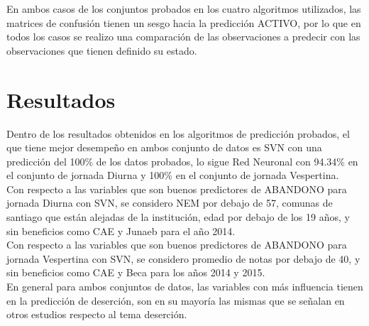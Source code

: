En ambos casos de los conjuntos probados en los cuatro algoritmos utilizados, las matrices de confusión tienen un sesgo hacia la predicción ACTIVO, por lo que en todos los casos se realizo una comparación de las observaciones a predecir con las observaciones que tienen definido su estado.\\

\section{Resultados}

Dentro de los resultados obtenidos en los algoritmos de predicción probados, el que tiene mejor desempeño en ambos conjunto de datos es SVN con una predicción del 100\% de los datos probados, lo sigue Red Neuronal con 94.34\% en el conjunto de jornada Diurna y 100\% en el conjunto de jornada Vespertina.\\

Con respecto a las variables que son buenos predictores de ABANDONO para jornada Diurna con SVN, se considero NEM por debajo de 57, comunas de santiago que están alejadas de la institución, edad por debajo de los 19 años, y sin beneficios como CAE y Junaeb para el año 2014.\\

Con respecto a las variables que son buenos predictores de ABANDONO para jornada Vespertina con SVN, se considero promedio de notas por debajo de 40, y sin beneficios como CAE y Beca para los años 2014 y 2015.\\

En general para ambos conjuntos de datos, las variables con más influencia tienen en la predicción de deserción, son en su mayoría las mismas que se señalan en otros estudios respecto al tema deserción.\\
